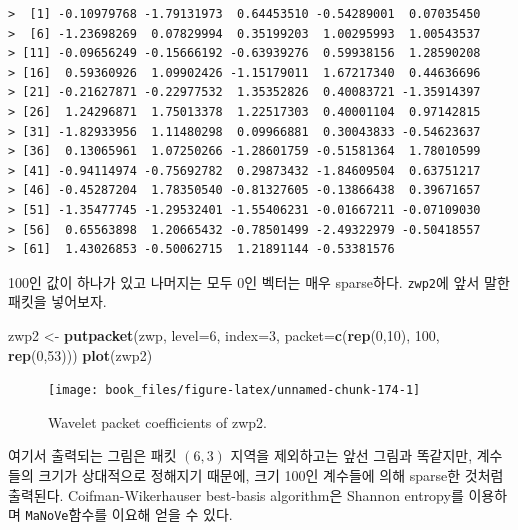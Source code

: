 \documentclass[b5paper,]{scrbook}
\makeatletter
\newenvironment{Shaded}{\begin{snugshade}}{\end{snugshade}}
\newcommand{\KeywordTok}[1]{\textcolor[rgb]{0.13,0.29,0.53}{\textbf{{#1}}}}
\newcommand{\DataTypeTok}[1]{\textcolor[rgb]{0.13,0.29,0.53}{{#1}}}
\newcommand{\DecValTok}[1]{\textcolor[rgb]{0.00,0.00,0.81}{{#1}}}
\newcommand{\StringTok}[1]{\textcolor[rgb]{0.31,0.60,0.02}{{#1}}}
\newcommand{\NormalTok}[1]{{#1}}
\theoremstyle{plain}
\theoremstyle{definition}
\numberwithin{equation}{section}
\newenvironment{kframe}{%
\medskip{}
\setlength{\fboxsep}{.8em}
 \def\at@end@of@kframe{}%
 \ifinner\ifhmode%
  \def\at@end@of@kframe{\end{minipage}}%
  \begin{minipage}{\columnwidth}%
 \fi\fi%
 \def\FrameCommand##1{\hskip\@totalleftmargin \hskip-\fboxsep
 \colorbox{shadecolor}{##1}\hskip-\fboxsep
     \hskip-\linewidth \hskip-\@totalleftmargin \hskip\columnwidth}%
 \MakeFramed {\advance\hsize-\width
   \@totalleftmargin\z@ \linewidth\hsize
   \@setminipage}}%
 {\par\unskip\endMakeFramed%
 \at@end@of@kframe}
\renewenvironment{Shaded}{\begin{kframe}}{\end{kframe}}
\makeatother
\begin{document}
\begin{verbatim}
>  [1] -0.10979768 -1.79131973  0.64453510 -0.54289001  0.07035450
>  [6] -1.23698269  0.07829994  0.35199203  1.00295993  1.00543537
> [11] -0.09656249 -0.15666192 -0.63939276  0.59938156  1.28590208
> [16]  0.59360926  1.09902426 -1.15179011  1.67217340  0.44636696
> [21] -0.21627871 -0.22977532  1.35352826  0.40083721 -1.35914397
> [26]  1.24296871  1.75013378  1.22517303  0.40001104  0.97142815
> [31] -1.82933956  1.11480298  0.09966881  0.30043833 -0.54623637
> [36]  0.13065961  1.07250266 -1.28601759 -0.51581364  1.78010599
> [41] -0.94114974 -0.75692782  0.29873432 -1.84609504  0.63751217
> [46] -0.45287204  1.78350540 -0.81327605 -0.13866438  0.39671657
> [51] -1.35477745 -1.29532401 -1.55406231 -0.01667211 -0.07109030
> [56]  0.65563898  1.20665432 -0.78501499 -2.49322979 -0.50418557
> [61]  1.43026853 -0.50062715  1.21891144 -0.53381576
\end{verbatim}

100인 값이 하나가 있고 나머지는 모두 0인 벡터는 매우 sparse하다.
\texttt{zwp2}에 앞서 말한 패킷을 넣어보자.

\begin{Shaded}
\begin{Highlighting}[]
\NormalTok{zwp2 <-}\StringTok{ }\KeywordTok{putpacket}\NormalTok{(zwp, }\DataTypeTok{level=}\DecValTok{6}\NormalTok{, }\DataTypeTok{index=}\DecValTok{3}\NormalTok{, }\DataTypeTok{packet=}\KeywordTok{c}\NormalTok{(}\KeywordTok{rep}\NormalTok{(}\DecValTok{0}\NormalTok{,}\DecValTok{10}\NormalTok{), }\DecValTok{100}\NormalTok{, }\KeywordTok{rep}\NormalTok{(}\DecValTok{0}\NormalTok{,}\DecValTok{53}\NormalTok{)))}
\KeywordTok{plot}\NormalTok{(zwp2)}
\end{Highlighting}
\end{Shaded}

\begin{figure}

{\centering \texttt{[image: book\_files/figure-latex/unnamed-chunk-174-1]} 

}

\caption{Wavelet packet coefficients of zwp2.}\label{fig:unnamed-chunk-174}
\end{figure}

여기서 출력되는 그림은 패킷 \((6,3)\) 지역을 제외하고는 앞선 그림과
똑같지만, 계수들의 크기가 상대적으로 정해지기 때문에, 크기 100인
계수들에 의해 sparse한 것처럼 출력된다. Coifman-Wikerhauser best-basis
algorithm은 Shannon entropy를 이용하며 \texttt{MaNoVe}함수를 이요해 얻을
수 있다.
\end{document}

